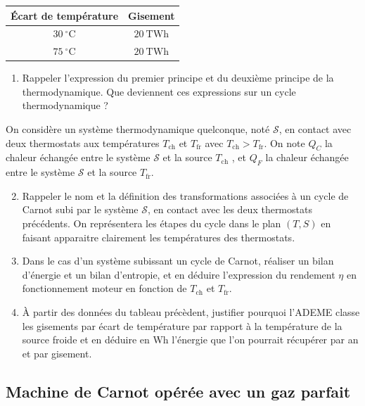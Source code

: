 \documentclass[a4paper, 12pt, garamond]{book}
\begin{document}
\begin{center}
	\begin{tabular}{cc}
		\toprule
		Écart de température     & Gisement
		\\
		\midrule
		\(30\ ^\circ\mathrm{C}\) & \(20\ \mathrm{TWh}\)
		\\
		\(75\ ^\circ\mathrm{C}\) & \(20\ \mathrm{TWh}\)
		\\
		\bottomrule
	\end{tabular}
\end{center}

\begin{enumerate}
	\item
	      Rappeler l'expression du premier principe et du deuxième principe de
	      la thermodynamique. Que deviennent ces expressions sur un cycle
	      thermodynamique ?
\end{enumerate}

On considère un système thermodynamique quelconque, noté
\(\mathcal{S}\), en contact avec deux thermostats aux températures
\(T_\mathrm{ch}\) et \(T_\mathrm{fr}\) avec
\(T_\mathrm{ch} > T_\mathrm{fr}\). On note \(Q_C\) la chaleur échangée
entre le système \(\mathcal{S}\) et la source \(T_\mathrm{ch}\) , et
\(Q_F\) la chaleur échangée entre le système \(\mathcal{S}\) et la
source \(T_\mathrm{fr}\).

\begin{enumerate}
	\setcounter{enumi}{1}
	\item
	      Rappeler le nom et la définition des transformations associées à un
	      cycle de Carnot subi par le système \(\mathcal{S}\), en contact avec
	      les deux thermostats précédents. On représentera les étapes du cycle
	      dans le plan \((T,S)\) en faisant apparaitre clairement les
	      températures des thermostats.
	\item
	      Dans le cas d'un système subissant un cycle de Carnot, réaliser un
	      bilan d'énergie et un bilan d'entropie, et en déduire l'expression du
	      rendement \(\eta\) en fonctionnement moteur en fonction de
	      \(T_\mathrm{ch}\) et \(T_\mathrm{fr}\).
	\item
	      À partir des données du tableau précèdent, justifier pourquoi l'ADEME
	      classe les gisements par écart de température par rapport à la
	      température de la source froide et en déduire en Wh l'énergie que l'on
	      pourrait récupérer par an et par gisement.
\end{enumerate}

\subsection{Machine de Carnot opérée avec un gaz parfait}
\end{document}
